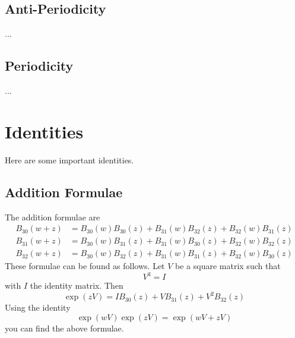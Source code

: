 \subsection{Anti-Periodicity}
...
\subsection{Periodicity}
...
\section{Identities}
Here are some important identities.
\subsection{Addition Formulae}
The addition formulae are
\begin{align}
    B_{30}(w + z) &= B_{30}(w) B_{30}(z) + B_{31}(w) B_{32}(z) + B_{32}(w) B_{31}(z) \\
    B_{31}(w + z) &= B_{30}(w) B_{31}(z) + B_{31}(w) B_{30}(z) + B_{32}(w) B_{32}(z) \\
    B_{32}(w + z) &= B_{30}(w) B_{32}(z) + B_{31}(w) B_{31}(z) + B_{32}(w) B_{30}(z)
\end{align}
These formulae can be found as follows. Let $V$ be a square matrix such that
\begin{equation}
    V^{3} = I
\end{equation}
with $I$ the identity matrix. Then
\begin{equation}
    \exp\left( z V \right) = I B_{30}(z) + V B_{31}(z) + V^{2} B_{32}(z)
\end{equation}
Using the identity
\begin{equation}
    \exp\left( w V \right) \exp\left( z V \right) = \exp\left( wV + zV \right)
\end{equation}
you can find the above formulae.
